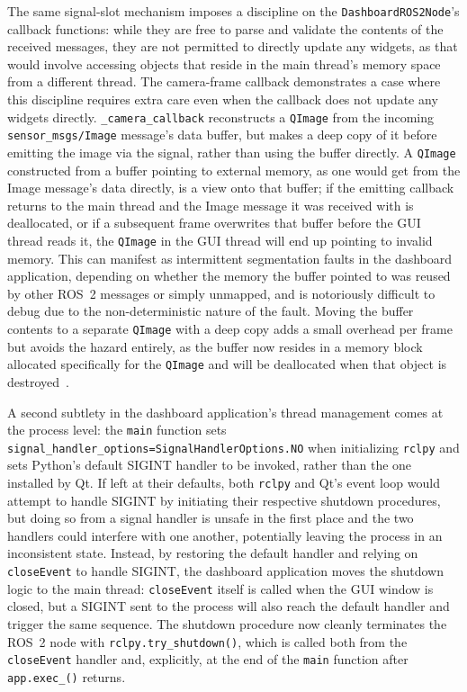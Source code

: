 The same signal-slot mechanism imposes a discipline on the \texttt{DashboardROS2Node}'s callback functions: while they are free to parse and validate the contents of the received messages, they are not permitted to directly update any widgets, as that would involve accessing objects that reside in the main thread's memory space from a different thread. The camera-frame callback demonstrates a case where this discipline requires extra care even when the callback does not update any widgets directly. \texttt{\_camera\_callback} reconstructs a \texttt{QImage} from the incoming \texttt{sensor\_msgs/Image} message's data buffer, but makes a deep copy of it before emitting the image via the signal, rather than using the buffer directly. A \texttt{QImage} constructed from a buffer pointing to external memory, as one would get from the Image message's data directly, is a view onto that buffer; if the emitting callback returns to the main thread and the Image message it was received with is deallocated, or if a subsequent frame overwrites that buffer before the GUI thread reads it, the \texttt{QImage} in the GUI thread will end up pointing to invalid memory. This can manifest as intermittent segmentation faults in the dashboard application, depending on whether the memory the buffer pointed to was reused by other ROS~2 messages or simply unmapped, and is notoriously difficult to debug due to the non-deterministic nature of the fault. Moving the buffer contents to a separate \texttt{QImage} with a deep copy adds a small overhead per frame but avoids the hazard entirely, as the buffer now resides in a memory block allocated specifically for the \texttt{QImage} and will be deallocated when that object is destroyed~\cite{blass2022real_thesis}.

A second subtlety in the dashboard application's thread management comes at the process level: the \texttt{main} function sets \texttt{signal\_handler\_options=SignalHandlerOptions.NO} when initializing \texttt{rclpy} and sets Python's default SIGINT handler to be invoked, rather than the one installed by Qt. If left at their defaults, both \texttt{rclpy} and Qt's event loop would attempt to handle SIGINT by initiating their respective shutdown procedures, but doing so from a signal handler is unsafe in the first place and the two handlers could interfere with one another, potentially leaving the process in an inconsistent state. Instead, by restoring the default handler and relying on \texttt{closeEvent} to handle SIGINT, the dashboard application moves the shutdown logic to the main thread: \texttt{closeEvent} itself is called when the GUI window is closed, but a SIGINT sent to the process will also reach the default handler and trigger the same sequence. The shutdown procedure now cleanly terminates the ROS~2 node with \texttt{rclpy.try\_shutdown()}, which is called both from the \texttt{closeEvent} handler and, explicitly, at the end of the \texttt{main} function after \texttt{app.exec\_()} returns.

